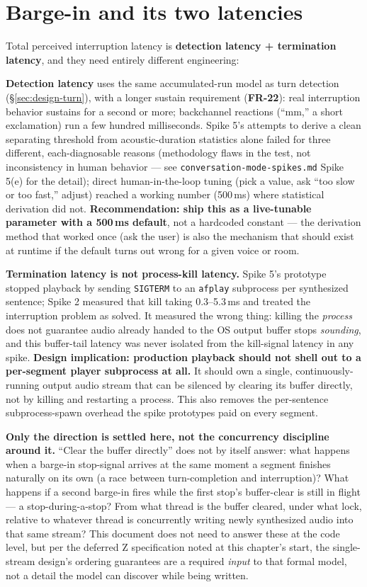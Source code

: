\documentclass[a4paper,11pt]{report}
\newcommand{\fr}[1]{\textbf{FR-#1}}
\begin{document}
\section{Barge-in and its two latencies}
\label{sec:design-termination}

Total perceived interruption latency is \textbf{detection latency +
termination latency}, and they need entirely different engineering:

\textbf{Detection latency} uses the same accumulated-run model as turn
detection (\S\ref{sec:design-turn}), with a longer sustain requirement
(\fr{22}): real interruption behavior sustains for a second or more;
backchannel reactions (``mm,'' a short exclamation) run a few hundred
milliseconds. Spike 5's attempts to derive a clean separating threshold
from acoustic-duration statistics alone failed for three different,
each-diagnosable reasons (methodology flaws in the test, not
inconsistency in human behavior --- see \texttt{conversation-mode-spikes.md}
Spike 5(e) for the detail); direct human-in-the-loop tuning (pick a
value, ask ``too slow or too fast,'' adjust) reached a working number
(500\,ms) where statistical derivation did not. \textbf{Recommendation:
ship this as a live-tunable parameter with a 500\,ms default}, not a
hardcoded constant --- the derivation method that worked once (ask the
user) is also the mechanism that should exist at runtime if the default
turns out wrong for a given voice or room.

\textbf{Termination latency is not process-kill latency.} Spike 5's
prototype stopped playback by sending \texttt{SIGTERM} to an
\texttt{afplay} subprocess per synthesized sentence; Spike 2 measured
that kill taking 0.3--5.3\,ms and treated the interruption problem as
solved. It measured the wrong thing: killing the \emph{process} does not
guarantee audio already handed to the OS output buffer stops
\emph{sounding}, and this buffer-tail latency was never isolated from the
kill-signal latency in any spike. \textbf{Design implication: production
playback should not shell out to a per-segment player subprocess at all.}
It should own a single, continuously-running output audio stream that can
be silenced by clearing its buffer directly, not by killing and
restarting a process. This also removes the per-sentence subprocess-spawn
overhead the spike prototypes paid on every segment.

\textbf{Only the direction is settled here, not the concurrency
discipline around it.} ``Clear the buffer directly'' does not by itself
answer: what happens when a barge-in stop-signal arrives at the same
moment a segment finishes naturally on its own (a race between
turn-completion and interruption)? What happens if a second barge-in
fires while the first stop's buffer-clear is still in flight --- a
stop-during-a-stop? From what thread is the buffer cleared, under what
lock, relative to whatever thread is concurrently writing newly
synthesized audio into that same stream? This document does not need to
answer these at the code level, but per the deferred Z specification
noted at this chapter's start, the single-stream design's ordering
guarantees are a required \emph{input} to that formal model, not a detail
the model can discover while being written.
\end{document}
